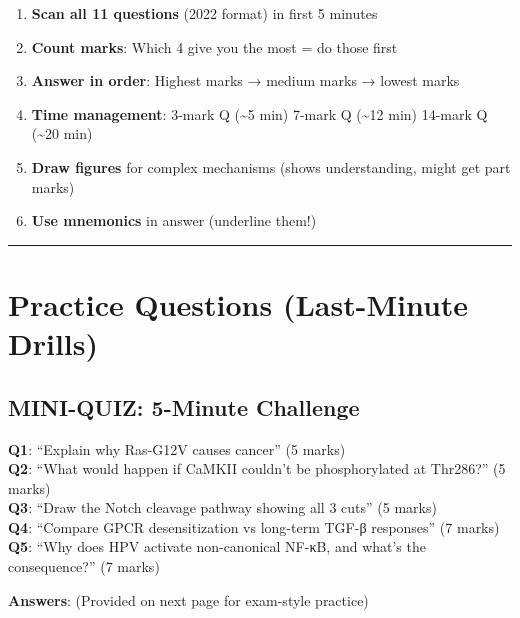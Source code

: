 \begin{enumerate}
\def\labelenumi{\arabic{enumi}.}
\tightlist
\item
  \textbf{Scan all 11 questions} (2022 format) in first 5 minutes
\item
  \textbf{Count marks}: Which 4 give you the most = do those first
\item
  \textbf{Answer in order}: Highest marks → medium marks → lowest marks
\item
  \textbf{Time management}: 3-mark Q (\textasciitilde5 min) \textbar{}
  7-mark Q (\textasciitilde12 min) \textbar{} 14-mark Q
  (\textasciitilde20 min)
\item
  \textbf{Draw figures} for complex mechanisms (shows understanding,
  might get part marks)
\item
  \textbf{Use mnemonics} in answer (underline them!)
\end{enumerate}

\begin{center}\rule{0.5\linewidth}{0.5pt}\end{center}

\hypertarget{practice-questions-last-minute-drills}{%
\section{Practice Questions (Last-Minute
Drills)}\label{practice-questions-last-minute-drills}}

\hypertarget{mini-quiz-5-minute-challenge}{%
\subsection{\texorpdfstring{\textbf{MINI-QUIZ: 5-Minute
Challenge}}{MINI-QUIZ: 5-Minute Challenge}}\label{mini-quiz-5-minute-challenge}}

\textbf{Q1}: ``Explain why Ras-G12V causes cancer'' (5 marks)\\
\textbf{Q2}: ``What would happen if CaMKII couldn't be phosphorylated at
Thr286?'' (5 marks)\\
\textbf{Q3}: ``Draw the Notch cleavage pathway showing all 3 cuts'' (5
marks)\\
\textbf{Q4}: ``Compare GPCR desensitization vs long-term TGF-β
responses'' (7 marks)\\
\textbf{Q5}: ``Why does HPV activate non-canonical NF-κB, and what's the
consequence?'' (7 marks)

\textbf{Answers}: (Provided on next page for exam-style practice)

